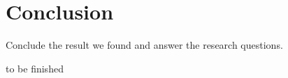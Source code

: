 \documentclass[acmtog]{acmart}
\begin{document}
\section{Conclusion}
Conclude the result we found and answer the research questions.


\begin{acks}
to be finished
\end{acks}






\end{document}
